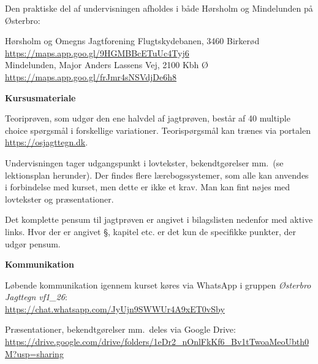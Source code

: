 \documentclass[10pt,a4paper]{article}
\begin{document}
\begin{flushleft}
\vspace{0.2cm}
Den praktiske del af undervisningen afholdes i både Hørsholm og Mindelunden på Østerbro:

\vspace{0.1cm}
\hspace{1em} Hørsholm og Omegns Jagtforening Flugtskydebanen, 3460 Birkerød\\
\hspace{1em} \url{https://maps.app.goo.gl/9HGMBBcETuUc4Tyj6}
\\
\vspace{0.2cm}
\hspace{1em} Mindelunden, Major Anders Lassens Vej, 2100 Kbh Ø\\
\hspace{1em} \url{https://maps.app.goo.gl/frJmr4sNSVdjDe6h8}

\vspace{0.4cm}
\textbf{Kursusmateriale}

\vspace{0.1cm}
Teoriprøven, som udgør den ene halvdel af jagtprøven, består af 40 multiple choice spørgsmål i forskellige variationer. Teorispørgsmål kan trænes via portalen \url{https://osjagttegn.dk}.

\vspace{0.2cm}
Undervisningen tager udgangspunkt i lovtekster, bekendtgørelser mm.\ (se lektionsplan herunder). Der findes flere lærebogssystemer, som alle kan anvendes i forbindelse med kurset, men dette er ikke et krav. Man kan fint nøjes med lovtekster og præsentationer.

\vspace{0.2cm}
Det komplette pensum til jagtprøven er angivet i bilagslisten nedenfor med aktive links. Hvor der er angivet §, kapitel etc. er det kun de specifikke punkter, der udgør pensum. 

\vspace{0.4cm}
\textbf{Kommunikation}

\vspace{0.1cm}
Løbende kommunikation igennem kurset køres via WhatsApp i gruppen \emph{Østerbro Jagttegn vf1\_26}:\\
\url{https://chat.whatsapp.com/JyUjn9SWWUr4A9xET0vSby}

\vspace{0.2cm}
Præsentationer, bekendtgørelser mm.\ deles via Google Drive:\\
\url{https://drive.google.com/drive/folders/1eDr2_nOnlFkKf6_Bv1tTwoaMeoUbth0M?usp=sharing}


\end{flushleft}
\end{document}
